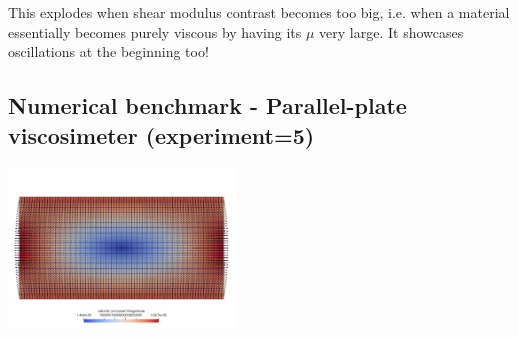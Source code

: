 {\color{red}This explodes when shear modulus contrast becomes too big, i.e. when a material 
essentially becomes purely viscous by having its $\mu$ very large. }
It showcases oscillations at the beginning too!





\newpage
\subsection*{Numerical benchmark - Parallel-plate viscosimeter (experiment=5)}

\begin{center}
\includegraphics[width=6cm]{python_codes/fieldstone_129/results/experiment5/setup}
\end{center}




